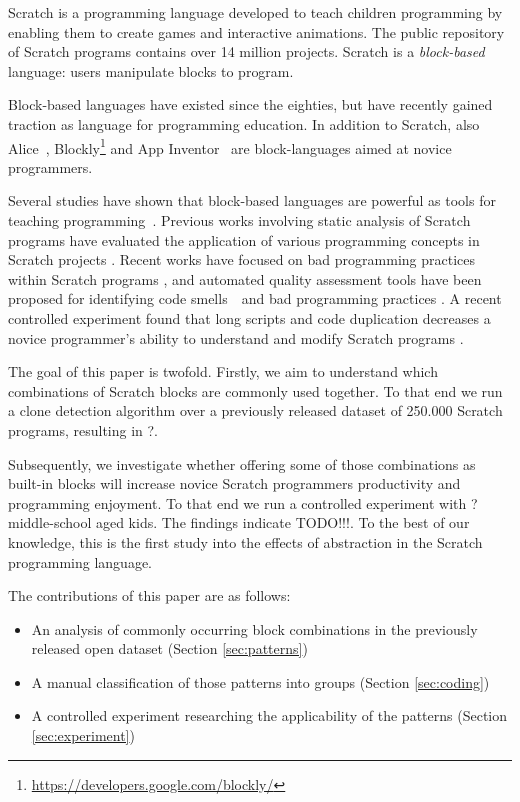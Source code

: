 \documentclass[preprint]{sigplanconf}
\newcommand{\nPatterns}{?}
\newcommand{\nKids}{?}
\newcommand{\todo}{TODO!!!}
\begin{document}
Scratch \cite{resnick_scratch:_2009} is a programming language developed to teach children programming by enabling them to create games and interactive animations. The public repository of Scratch programs contains over 14 million projects. Scratch is a \emph{block-based} language: users manipulate blocks to program.

Block-based languages have existed since the eighties, but have recently gained traction as language for programming education. In addition to Scratch, also Alice~\cite{conway_alice:_1994}, Blockly\footnote{\url{https://developers.google.com/blockly/}} and App Inventor~\cite{wolber_app_2011} are block-languages aimed at novice programmers.

Several studies have shown that block-based languages are powerful as tools for teaching programming~\cite{meerbaum-salant_learning_2010, b._moskal_evaluating_2005,cooper_teaching_2003,price_comparing_2015}. Previous works involving static analysis of Scratch programs have evaluated the application of various programming concepts in Scratch projects \cite{Maloney_2008,moreno_automatic_2014}. Recent works have focused on bad programming practices within Scratch programs \cite{Meerbaum_habits_2011}, and automated quality assessment tools have been proposed for identifying code smells~\cite{fowler_refactoring:_1999}~and bad programming practices \cite{boe_hairball:_2013,moreno_automatic_2014}. A recent controlled experiment found that long scripts and code duplication decreases a novice programmer's ability to understand and modify Scratch programs \cite{hermans_2016}.

The goal of this paper is twofold. Firstly, we aim to understand which combinations of Scratch blocks are commonly used together. To that end we run a clone detection algorithm over a previously released dataset of 250.000 Scratch programs, resulting in \nPatterns.

Subsequently, we investigate whether offering some of those combinations as built-in blocks will increase novice Scratch programmers productivity and programming enjoyment. To that end we run a controlled experiment with \nKids middle-school aged kids. The findings indicate \todo. To the best of our knowledge, this is the first study into the effects of abstraction in the Scratch programming language.

The contributions of this paper are as follows:

\begin{itemize}
	\item{An analysis of commonly occurring block combinations in the previously released open dataset (Section \ref{sec:patterns})}
	\item{A manual classification of those patterns into groups (Section \ref{sec:coding})}
	\item{A controlled experiment researching the applicability of the patterns (Section \ref{sec:experiment})}
\end{itemize}
\end{document}
